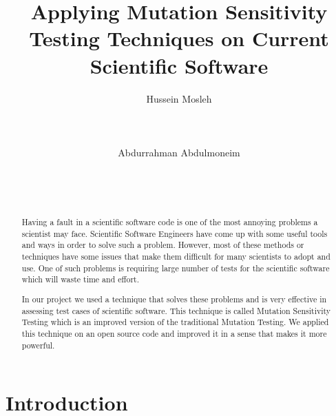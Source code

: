 \documentclass{acm_proc_article-sp}
\begin{document}
\title{Applying {\ttlit Mutation Sensitivity Testing} Techniques on Current Scientific Software}

\author{
\alignauthor
Hussein Mosleh\\
       \\
       \\
       \\
\alignauthor
Abdurrahman Abdulmoneim\\
       \\
       \\
       \\
}

\maketitle
\begin{abstract}
Having a fault in a scientific software code is one of the most annoying problems a scientist may face. Scientific Software Engineers have come up with some useful tools and ways in order to solve such a problem. However, most of these methods or techniques have some issues that make them difficult for many scientists to adopt and use. One of such problems is requiring large number of tests for the scientific software which will waste time and effort.

In our project we used a technique that solves these problems and is very effective in assessing test cases of scientific software. This technique is called Mutation Sensitivity Testing which is an improved version of the traditional Mutation Testing. We applied this technique on an open source code and improved it in a sense that makes it more powerful.
\end{abstract}




\section{Introduction}
\end{document}
